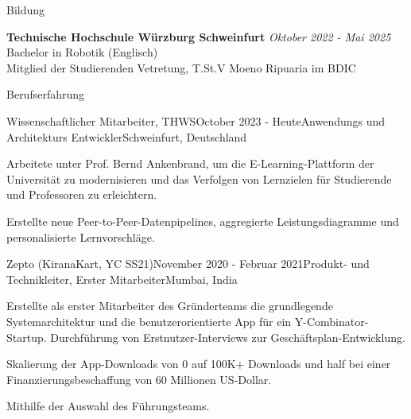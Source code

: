 \documentclass[
	a4paper, %
	10pt, %
]{resume} %
\begin{document}

\begin{rSection}{Bildung}

	\textbf{Technische Hochschule Würzburg Schweinfurt} \hfill \textit{Oktober 2022 - Mai 2025} \\
	Bachelor in Robotik (Englisch) \\
	Mitglied der Studierenden Vetretung, T.St.V Moeno Ripuaria im BDIC \\

\end{rSection}


\begin{rSection}{Berufserfahrung}

	\begin{rSubsection}{Wissenschaftlicher Mitarbeiter, THWS}{October 2023 - Heute}{Anwendungs und Architekturs Entwickler}{Schweinfurt, Deutschland}
		\item Arbeitete unter Prof. Bernd Ankenbrand, um die E-Learning-Plattform der Universität zu modernisieren und das Verfolgen von Lernzielen für Studierende und Professoren zu erleichtern.
		\item Erstellte neue Peer-to-Peer-Datenpipelines, aggregierte Leistungsdiagramme und personalisierte Lernvorschläge.
	\end{rSubsection}


	\begin{rSubsection}{Zepto (KiranaKart, YC SS21)}{November 2020 - Februar 2021}{Produkt- und Technikleiter, Erster Mitarbeiter}{Mumbai, India}
		\item Erstellte als erster Mitarbeiter des Gründerteams die grundlegende Systemarchitektur und die benutzerorientierte App für ein Y-Combinator-Startup. Durchführung von Erstnutzer-Interviews zur Geschäftsplan-Entwicklung.
		\item Skalierung der App-Downloads von 0 auf 100K+ Downloads und half bei einer Finanzierungsbeschaffung von 60 Millionen US-Dollar.
		\item Mithilfe der Auswahl des Führungsteams.

	\end{rSubsection}

\end{rSection}
\end{document}
